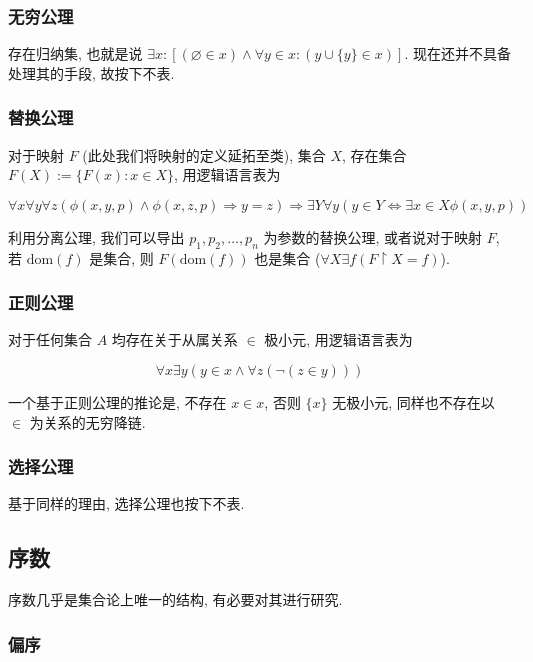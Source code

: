 \subsubsection{无穷公理}

存在归纳集, 也就是说 \(\exists x : [(\varnothing \in x) \wedge \forall y \in x : (y \cup \{y\} \in x)]\).
现在还并不具备处理其的手段, 故按下不表.

\subsubsection{替换公理}

对于映射 \(F\) (此处我们将映射的定义延拓至类), 集合 \(X\), 存在集合 \(F(X) := \{F(x) : x \in X\}\), 用逻辑语言表为

\[
    \forall x \forall y \forall z (\phi(x,y,p) \wedge \phi(x,z,p) \Rightarrow y = z) \Rightarrow \exists Y \forall y (y \in Y \Leftrightarrow \exists x \in X \phi(x,y,p))
\]

利用分离公理, 我们可以导出 \(p_1, p_2, \dots, p_n\) 为参数的替换公理, 或者说对于映射 \(F\),
若 \(\mathrm{dom} (f)\) 是集合, 则 \(F(\mathrm{dom}(f))\) 也是集合 (\(\forall X \exists f (F \upharpoonright X = f)\)). 

\subsubsection{正则公理}

对于任何集合 \(A\) 均存在关于从属关系 \(\in\) 极小元, 用逻辑语言表为

\[
    \forall x \exists y(y \in x \wedge \forall z (\neg(z \in y)))
\]

一个基于正则公理的推论是, 不存在 \(x \in x\), 否则 \(\{x\}\) 无极小元, 同样也不存在以 \(\in\)
为关系的无穷降链.

\subsubsection{选择公理}

基于同样的理由, 选择公理也按下不表.

\subsection{序数}

序数几乎是集合论上唯一的结构, 有必要对其进行研究.

\subsubsection{偏序}

